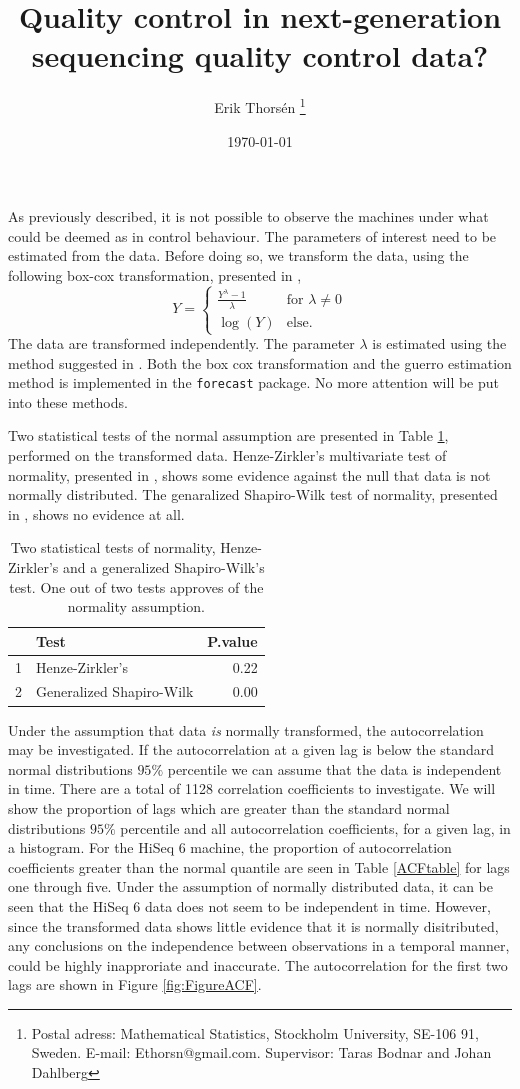 \documentclass[a4paper,11pt,fleqn,twoside,notitlepage]{report}
\title{Quality control in next-generation sequencing quality control data?}
\author{Erik Thors\'{e}n \thanks{Postal adress: Mathematical Statistics, Stockholm University, SE-106 91, Sweden. E-mail: Ethorsn@gmail.com. Supervisor: Taras Bodnar and Johan Dahlberg}}
\date{\today}
\begin{document}
As previously described, it is not possible to observe the machines under what could be deemed as in control behaviour. The parameters of interest need to be estimated from the data. Before doing so, we transform the data, using the following box-cox transformation, presented in \cite{BoxCox}, 
$$
Y=
\begin{cases}
\frac{Y^{\lambda}-1}{\lambda} & \text{for } \lambda \neq 0 \\
\log(Y) & \text{else}.
\end{cases}
$$
The data are transformed independently. The parameter $\lambda$ is estimated using the method suggested in \cite{Gurrero}. Both the box cox transformation and the guerro estimation method is implemented in the \texttt{forecast} package. No more attention will be put into these methods. 

Two statistical tests of the normal assumption are presented in Table \ref{TestTable}, performed on the transformed data. Henze-Zirkler's multivariate test of normality, presented in \cite{HenzeZirkler}, shows some evidence against the null that data is not normally distributed. The genaralized Shapiro-Wilk test of normality, presented in \cite{GenShapWilk}, shows no evidence at all.
\begin{table}[ht]
\centering
\begin{tabular}{rlr}
  \hline
 & Test & P.value \\ 
  \hline
1 & Henze-Zirkler's & 0.22 \\ 
  2 & Generalized Shapiro-Wilk & 0.00 \\ 
   \hline
\end{tabular}
\caption{Two statistical tests of normality, Henze-Zirkler's and a generalized Shapiro-Wilk's test. One out of two tests approves of the normality assumption.} 
\label{TestTable}
\end{table}

Under the assumption that data \textit{is} normally transformed, the autocorrelation may be investigated. If the autocorrelation at a given lag is below the standard normal distributions $95\%$ percentile we can assume that the data is independent in time. There are a total of 1128 correlation coefficients to investigate. We will show the proportion of lags which are greater than the standard normal distributions $95\%$ percentile and all autocorrelation coefficients, for a given lag, in a histogram. 
For the HiSeq 6 machine, the proportion of autocorrelation coefficients greater than the normal quantile are seen in Table \ref{ACFtable} for lags one through five. Under the assumption of normally distributed data, it can be seen that the HiSeq 6 data does not seem to be independent in time. However, since the transformed data shows little evidence that it is normally disitributed, any conclusions on the independence between observations in a temporal manner, could be highly inapproriate and inaccurate. The autocorrelation for the first two lags are shown in Figure \ref{fig:FigureACF}. 
\end{document}
